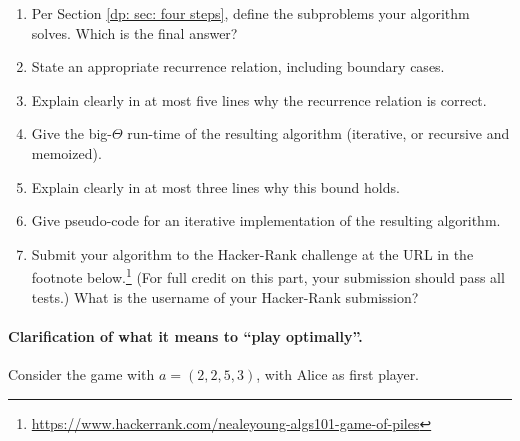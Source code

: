 \documentclass[11pt]{article}
\begin{document}
\begin{enumerate}[label=(\alph*)]
  \item

Per Section \ref{dp: sec: four steps}, define the subproblems your algorithm solves.
Which is the final answer?

\item

State an appropriate recurrence relation, including boundary cases.

\item
  
  Explain clearly in at most five lines why the recurrence relation is correct.



\item

Give the big-$\Theta$ run-time of the resulting algorithm (iterative, or recursive and memoized).

\item
  
Explain clearly in at most three lines why this bound holds.

\item
  
Give pseudo-code for an iterative implementation of the resulting algorithm.

\item

  Submit your algorithm to the Hacker-Rank challenge at the URL in the footnote below.\footnote
  {\url{https://www.hackerrank.com/nealeyoung-algs101-game-of-piles}}
  (For full credit on this part, your submission should pass all tests.)
  What is the username of your Hacker-Rank submission? 
  
\end{enumerate}

\paragraph{Clarification of what it means to ``play optimally''.} Consider the game with $a=(2, 2, 5, 3)$, with Alice as first player.
 
\end{document}
